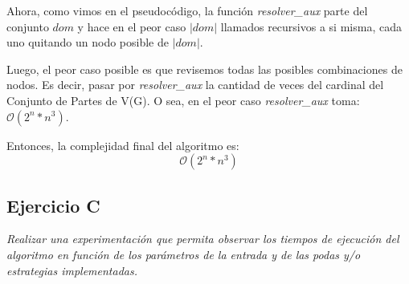 Ahora, como vimos en el pseudocódigo, la función \textit{resolver_aux} parte del conjunto $dom$ y hace en el peor caso $|dom|$ llamados recursivos a si misma, cada uno quitando un nodo posible de $|dom|$.

Luego, el peor caso posible es que revisemos todas las posibles combinaciones de nodos. Es decir, pasar por \textit{resolver_aux} la cantidad de veces del cardinal del Conjunto de Partes de V(G). O sea, en el peor caso \textit{resolver_aux} toma: $\mathcal{O}(2^n*n^3)$.

Entonces, la complejidad final del algoritmo es:
$$\mathcal{O}(2^n*n^3)$$
\subsection{Ejercicio C}

\textit{Realizar una experimentación que permita observar los tiempos de ejecución del algoritmo en función de los parámetros de la entrada y de las podas y/o estrategias implementadas.}
\medskip
